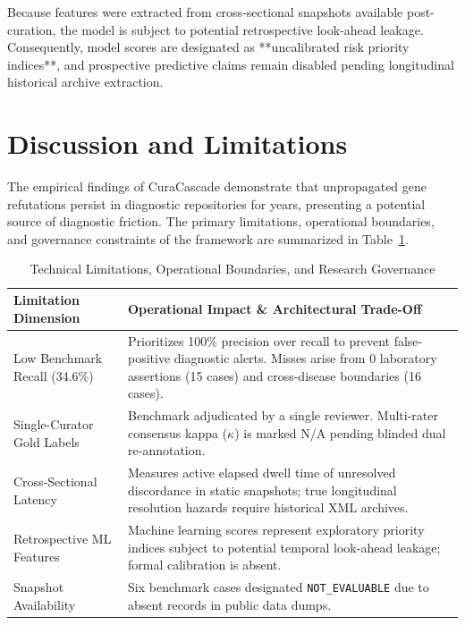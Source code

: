 \documentclass[conference]{IEEEtran}
\begin{document}
Because features were extracted from cross-sectional snapshots available post-curation, the model is subject to potential retrospective look-ahead leakage. Consequently, model scores are designated as **uncalibrated risk priority indices**, and prospective predictive claims remain disabled pending longitudinal historical archive extraction.

\section{Discussion and Limitations}
The empirical findings of CuraCascade demonstrate that unpropagated gene refutations persist in diagnostic repositories for years, presenting a potential source of diagnostic friction. The primary limitations, operational boundaries, and governance constraints of the framework are summarized in Table~\ref{tab:limitations}.

\begin{table}[t]
\caption{Technical Limitations, Operational Boundaries, and Research Governance}
\label{tab:limitations}
\centering
\begin{tabularx}{\columnwidth}{lX}
\toprule
\textbf{Limitation Dimension} & \textbf{Operational Impact \& Architectural Trade-Off} \\
\midrule
Low Benchmark Recall (34.6\%) & Prioritizes 100\% precision over recall to prevent false-positive diagnostic alerts. Misses arise from 0 laboratory assertions (15 cases) and cross-disease boundaries (16 cases). \\
Single-Curator Gold Labels & Benchmark adjudicated by a single reviewer. Multi-rater consensus kappa ($\kappa$) is marked N/A pending blinded dual re-annotation. \\
Cross-Sectional Latency & Measures active elapsed dwell time of unresolved discordance in static snapshots; true longitudinal resolution hazards require historical XML archives. \\
Retrospective ML Features & Machine learning scores represent exploratory priority indices subject to potential temporal look-ahead leakage; formal calibration is absent. \\
Snapshot Availability & Six benchmark cases designated \texttt{NOT\_EVALUABLE} due to absent records in public data dumps. \\
\bottomrule
\end{tabularx}
\end{table}
\end{document}
